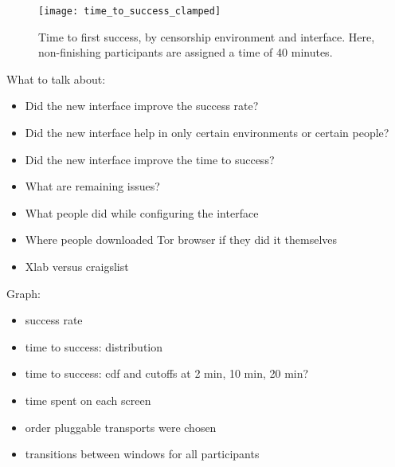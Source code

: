 \documentclass{template}
\begin{document}
\begin{figure}
\centering
\texttt{[image: time\_to\_success\_clamped]}
\caption{
Time to first success, by censorship environment and interface.
Here, non-finishing participants are assigned a time of 40 minutes.
}
\end{figure}

{\color {red} 
What to talk about: 
\begin{itemize} \itemsep1pt \parskip0pt  
\item{Did the new interface improve the success rate?}
\item{Did the new interface help in only certain environments or certain people?}
\item{Did the new interface improve the time to success?}
\item{What are remaining issues?} 
\item{What people did while configuring the interface}
\item{Where people downloaded Tor browser if they did it themselves} 
\item{Xlab versus craigslist} 
\end{itemize} 

Graph: 
\begin{itemize} \itemsep1pt \parskip0pt  
\item{success rate}
\item{time to success: distribution}
\item{time to success: cdf and cutoffs at 2 min, 10 min, 20 min?}  
\item{time spent on each screen}
\item{order pluggable transports were chosen}
\item{transitions between windows for all participants}
\end{itemize} 
} 
\end{document}
